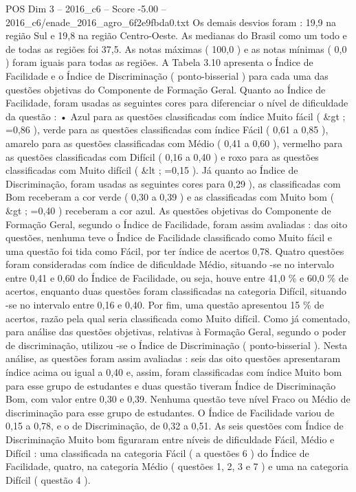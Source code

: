 \begin{textsample}{POS Dim 3 – 2016\_c6 – Score -5.00 – 2016\_c6/enade\_2016\_agro\_6f2e9fbda0.txt}
Os demais desvios foram : 19,9 na região Sul e 19,8 na região Centro-Oeste.
As medianas do Brasil como um todo e de todas as regiões foi 37,5.
As notas máximas ( 100,0 ) e as notas mínimas ( 0,0 ) foram iguais para todas as regiões.
A Tabela 3.10 apresenta o Índice de Facilidade e o Índice de Discriminação ( ponto-bisserial ) para cada uma das questões objetivas do Componente de Formação Geral.
Quanto ao Índice de Facilidade, foram usadas as seguintes cores para diferenciar o nível de dificuldade da questão : • Azul para as questões classificadas com índice Muito fácil ( \&gt ; =0,86 ), verde para as questões classificadas com índice Fácil ( 0,61 a 0,85 ), amarelo para as questões classificadas com Médio ( 0,41 a 0,60 ), vermelho para as questões classificadas com Difícil ( 0,16 a 0,40 ) e roxo para as questões classificadas com Muito difícil ( \&lt ; =0,15 ).
Já quanto ao Índice de Discriminação, foram usadas as seguintes cores para 0,29 ), as classificadas com Bom receberam a cor verde ( 0,30 a 0,39 ) e as classificadas com Muito bom ( \&gt ; =0,40 ) receberam a cor azul.
As questões objetivas do Componente de Formação Geral, segundo o Índice de Facilidade, foram assim avaliadas : das oito questões, nenhuma teve o Índice de Facilidade classificado como Muito fácil e uma questão foi tida como Fácil, por ter índice de acertos 0,78.
Quatro questões foram consideradas com índice de dificuldade Médio, situando -se no intervalo entre 0,41 e 0,60 do Índice de Facilidade, ou seja, houve entre 41,0 \% e 60,0 \% de acertos, enquanto duas questões foram classificadas na categoria Difícil, situando -se no intervalo entre 0,16 e 0,40.
Por fim, uma questão apresentou 15 \% de acertos, razão pela qual seria classificada como Muito difícil.
Como já comentado, para análise das questões objetivas, relativas à Formação Geral, segundo o poder de discriminação, utilizou -se o Índice de Discriminação ( ponto-bisserial ).
Nesta análise, as questões foram assim avaliadas : seis das oito questões apresentaram índice acima ou igual a 0,40 e, assim, foram classificadas com índice Muito bom para esse grupo de estudantes e duas questão tiveram Índice de Discriminação Bom, com valor entre 0,30 e 0,39.
Nenhuma questão teve nível Fraco ou Médio de discriminação para esse grupo de estudantes.
O Índice de Facilidade variou de 0,15 a 0,78, e o de Discriminação, de 0,32 a 0,51.
As seis questões com Índice de Discriminação Muito bom figuraram entre níveis de dificuldade Fácil, Médio e Difícil : uma classificada na categoria Fácil ( a questões 6 ) do Índice de Facilidade, quatro, na categoria Médio ( questões 1, 2, 3 e 7 ) e uma na categoria Difícil ( questão 4 ).

\end{textsample}

